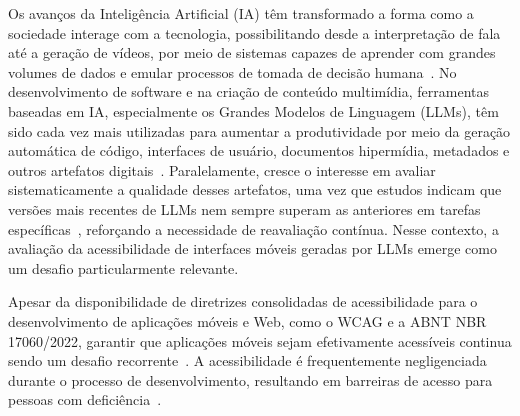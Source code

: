 \documentclass[sigconf,anonymous,review]{webmedia}
\begin{document}
Os avanços da Inteligência Artificial (IA) têm transformado a forma como a sociedade interage com a tecnologia, possibilitando desde a interpretação de fala até a geração de vídeos, por meio de sistemas capazes de aprender com grandes volumes de dados e emular processos de tomada de decisão humana~\cite{tai20impact, garcia20etica, Liu_2025, cheng2025realmdatasetrealworldllm}. No desenvolvimento de software e na criação de conteúdo multimídia, ferramentas baseadas em IA, especialmente os Grandes Modelos de Linguagem (LLMs), têm sido cada vez mais utilizadas para aumentar a produtividade por meio da geração automática de código, interfaces de usuário, documentos hipermídia, metadados e outros artefatos digitais~\cite{lima2019semantics, du24evaluating, tai20impact, de2023challenges}. Paralelamente, cresce o interesse em avaliar sistematicamente a qualidade desses artefatos, uma vez que estudos indicam que versões mais recentes de LLMs nem sempre superam as anteriores em tarefas específicas~\cite{chen2023chatgpt}, reforçando a necessidade de reavaliação contínua. Nesse contexto, a avaliação da acessibilidade de interfaces móveis geradas por LLMs emerge como um desafio particularmente relevante.

Apesar da disponibilidade de diretrizes consolidadas de acessibilidade para o desenvolvimento de aplicações móveis e Web, como o WCAG e a ABNT NBR 17060/2022, garantir que aplicações móveis sejam efetivamente acessíveis continua sendo um desafio recorrente~\cite{vendome19can, oliveira23analyzing,  ferraz2023platform}. A acessibilidade é frequentemente negligenciada durante o processo de desenvolvimento, resultando em barreiras de acesso para pessoas com deficiência~\cite{chen2022accessible, yan2019current, alshayban20accessibility, lima2021proposal}. %

\end{document}
